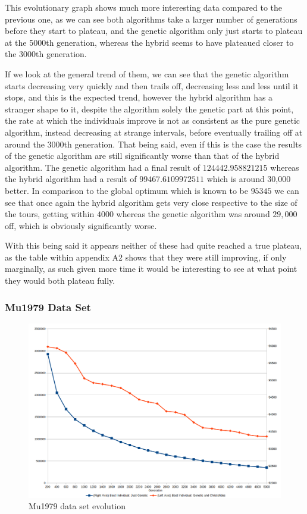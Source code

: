 \documentclass[11pt,a4paper,titlepage]{article}
\begin{document}
This evolutionary graph shows much more interesting data compared to the previous one, as we can see  both algorithms take a larger number of generations before they start to plateau, and the genetic algorithm only just starts to plateau at the 5000th generation, whereas the hybrid seems to have plateaued closer to the 3000th generation.

If we look at the general trend of them, we can see that the genetic algorithm starts decreasing very quickly and then trails off, decreasing less and less until it stops, and this is the expected trend, however the hybrid algorithm has a stranger shape to it, despite the algorithm solely the genetic part at this point, the rate at which the individuals improve is not as consistent as the pure genetic algorithm, instead decreasing at strange intervals, before eventually trailing off at around the 3000th generation. That being said, even if this is the case the results of the genetic algorithm are still significantly worse than that of the hybrid algorithm. The genetic algorithm had a final result of $124442.958821215$ whereas the hybrid algorithm had a result of $99467.6109972511$  which is around 30,000 better. In comparison to the global optimum which is known to be $95345$ we can see that once again the hybrid algorithm gets very close respective to the size of the tours, getting within $4000$ whereas the genetic algorithm was around $29,000$ off, which is obviously significantly worse.

With this being said it appears neither of these had quite reached a true plateau, as the table within appendix A2 shows that they were still improving, if only marginally, as such given more time it would be interesting to see at what point they would both plateau fully.

\pagebreak

\subsubsection{Mu1979 Data Set}

\begin{figure}[ht]
	\includegraphics[width=\textwidth]{mu1979Evolution}
	\centering
	\caption{Mu1979 data set evolution}
\end{figure}
\end{document}
